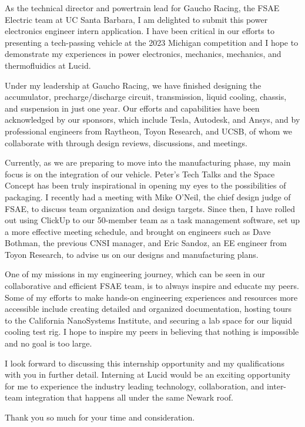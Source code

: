 \documentclass[11pt, letterpaper]{awesome-cv} %
\begin{document}
\makecvheader %

\makelettertitle %


\begin{cvletter}

As the technical director and powertrain lead for Gaucho Racing, the FSAE Electric team at UC Santa Barbara, I am delighted to submit this power electronics engineer intern application. I have been critical in our efforts to presenting a tech-passing vehicle at the 2023 Michigan competition and I hope to demonstrate my experiences in power electronics, mechanics, mechanics, and thermofluidics at Lucid. 

Under my leadership at Gaucho Racing, we have finished designing the accumulator, precharge/discharge circuit, transmission, liquid cooling, chassis, and suspension in just one year. Our efforts and capabilities have been acknowledged by our sponsors, which include Tesla, Autodesk, and Ansys, and by professional engineers from Raytheon, Toyon Research, and UCSB, of whom we collaborate with through design reviews, discussions, and meetings. 

Currently, as we are preparing to move into the manufacturing phase, my main focus is on the integration of our vehicle. Peter's Tech Talks and the Space Concept has been truly inspirational in opening my eyes to the possibilities of packaging. I recently had a meeting with Mike O'Neil, the chief design judge of FSAE, to discuss team organization and design targets. Since then, I have rolled out using ClickUp to our 50-member team as a task management software, set up a more effective meeting schedule, and brought on engineers such as Dave Bothman, the previous CNSI manager, and Eric Sandoz, an EE engineer from Toyon Research, to advise us on our designs and manufacturing plans.

One of my missions in my engineering journey, which can be seen in our collaborative and efficient FSAE team, is to always inspire and educate my peers. Some of my efforts to make hands-on engineering experiences and resources more accessible include creating detailed and organized documentation, hosting tours to the California NanoSystems Institute, and securing a lab space for our liquid cooling test rig. I hope to inspire my peers in believing that nothing is impossible and no goal is too large.

I look forward to discussing this internship opportunity and my qualifications with you in further detail. Interning at Lucid would be an exciting opportunity for me to experience the industry leading technology, collaboration, and inter-team integration that happens all under the same Newark roof. 

Thank you so much for your time and consideration.



\end{cvletter}


\makeletterclosing %
\end{document}
